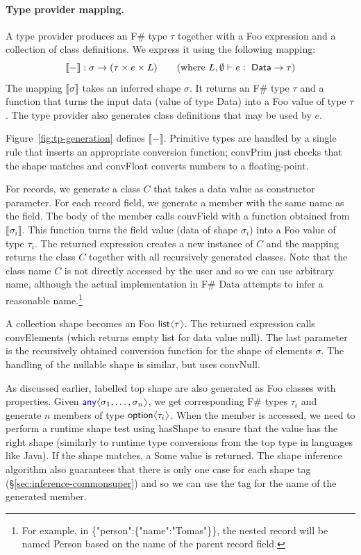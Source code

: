 \documentclass[10pt,preprint,blind,clearpagebib]{sigplanconf}
\newcommand{\langl}{\begin{picture}(4.5,7)
\put(1.1,2.5){\rotatebox{60}{\line(1,0){5.5}}}
\put(1.1,2.5){\rotatebox{300}{\line(1,0){5.5}}}
\end{picture}}
\newcommand{\rangl}{\begin{picture}(4.5,7)
\put(.9,2.5){\rotatebox{120}{\line(1,0){5.5}}}
\put(.9,2.5){\rotatebox{240}{\line(1,0){5.5}}}
\end{picture}}
\newcommand{\kvd}[1]{\textnormal{\textcolor{kvdclr}{\sffamily #1}}}
\newcommand{\str}[1]{\textnormal{\textcolor{strclr}{\sffamily "#1"}}}
\newcommand{\ident}[1]{\textnormal{\sffamily #1}}
\newcommand{\sem}[1]{\llbracket #1 \rrbracket}
\begin{document}
\paragraph{Type provider mapping.}
A type provider produces an F\# type $\tau$ together with a Foo expression and a collection of 
class definitions. We express it using the following mapping:
%
\begin{equation*}
\sem{-} : \sigma \rightarrow (\tau \times e \times L) \qquad (\textnormal{where}~L,\emptyset \vdash e:\ident{Data}\rightarrow\tau)
\end{equation*}
%
The mapping $\sem{\sigma}$ takes an inferred shape $\sigma$. It returns an F\# type $\tau$ and
a function that turns the input data (value of type \ident{Data}) into a Foo value of type $\tau$. 
The type provider also generates class definitions that may be used by $e$. 

Figure~\ref{fig:tp-generation} defines $\sem{-}$. Primitive types are handled by a single rule that
inserts an appropriate conversion function; \ident{convPrim} just checks that the shape matches
and \ident{convFloat} converts numbers to a floating-point.

For records, we generate a class $C$ that takes a data value as constructor parameter. For each 
record field, we generate a member with the same name as the field. The body of the member calls 
\ident{convField} with a function obtained from $\sem{\sigma_i}$. This function turns the field 
value (data of shape $\sigma_i$) into a Foo value of type $\tau_i$. The returned expression creates a new instance of 
$C$ and the mapping returns the class $C$ together with all recursively generated classes. Note that 
the class name $C$ is not directly accessed by the user and so we can use arbitrary name, although the 
actual implementation in F\# Data attempts to infer a reasonable name.\footnote{For example, in 
\ident{\{\str{person}:\{\str{name}:\str{Tomas}\}\}}, the nested record will be named \ident{Person}
based on the name of the parent record field.}

A collection shape becomes an Foo $\ident{list}\langl\tau\rangl$. The returned expression calls \ident{convElements}
(which returns empty list for data value \kvd{null}). The last parameter is the recursively obtained
conversion function for the shape of elements $\sigma$. The handling of the nullable shape is similar,
but uses \ident{convNull}.

As discussed earlier, labelled top shape are also generated as Foo classes with properties. Given 
$\kvd{any}\langl\sigma_1, \ldots, \sigma_n\rangl$, we get corresponding F\# types $\tau_i$ and generate 
$n$ members of type $\ident{option}\langl \tau_i\rangl$. When the member is accessed, we need to perform
a runtime shape test using \ident{hasShape} to ensure that the value has the right shape (similarly to runtime 
type conversions from the top type in languages like Java). If the shape matches, a \ident{Some} value is 
returned. The shape inference algorithm also guarantees that there is only one case for each shape tag 
(\S\ref{sec:inference-commonsuper}) and so we can use the tag for the name of the generated member.
\end{document}
